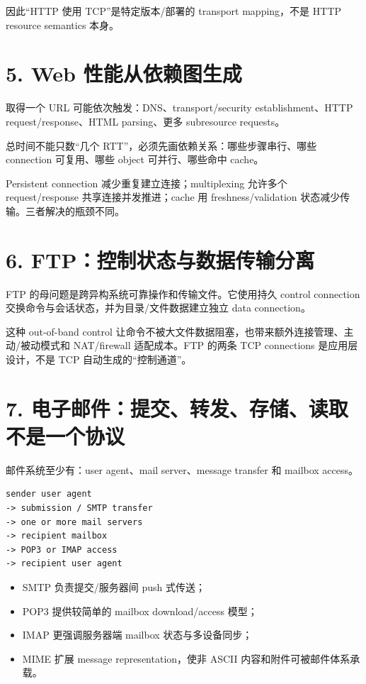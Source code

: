 \documentclass[UTF8,fontset=none,11pt,a4paper]{ctexart}
\providecommand{\tightlist}{\setlength{\itemsep}{0pt}\setlength{\parskip}{0pt}}
\begin{document}
因此``HTTP 使用 TCP''是特定版本/部署的 transport mapping，不是 HTTP
resource semantics 本身。

\section{5. Web
性能从依赖图生成}\label{5-web-ux6027ux80fdux4eceux4f9dux8d56ux56feux751fux6210}

取得一个 URL 可能依次触发：DNS、transport/security establishment、HTTP
request/response、HTML parsing、更多 subresource requests。

总时间不能只数``几个 RTT''，必须先画依赖关系：哪些步骤串行、哪些
connection 可复用、哪些 object 可并行、哪些命中 cache。

Persistent connection 减少重复建立连接；multiplexing 允许多个
request/response 共享连接并发推进；cache 用 freshness/validation
状态减少传输。三者解决的瓶颈不同。

\section{6.
FTP：控制状态与数据传输分离}\label{6-ftpux63a7ux5236ux72b6ux6001ux4e0eux6570ux636eux4f20ux8f93ux5206ux79bb}

FTP 的母问题是跨异构系统可靠操作和传输文件。它使用持久 control
connection 交换命令与会话状态，并为目录/文件数据建立独立 data
connection。

这种 out-of-band control
让命令不被大文件数据阻塞，也带来额外连接管理、主动/被动模式和
NAT/firewall 适配成本。FTP 的两条 TCP connections 是应用层设计，不是 TCP
自动生成的``控制通道''。

\section{7.
电子邮件：提交、转发、存储、读取不是一个协议}\label{7-ux7535ux5b50ux90aeux4ef6ux63d0ux4ea4ux8f6cux53d1ux5b58ux50a8ux8bfbux53d6ux4e0dux662fux4e00ux4e2aux534fux8bae}

邮件系统至少有：user agent、mail server、message transfer 和 mailbox
access。

\begin{lstlisting}
sender user agent
-> submission / SMTP transfer
-> one or more mail servers
-> recipient mailbox
-> POP3 or IMAP access
-> recipient user agent
\end{lstlisting}

\begin{itemize}
\tightlist
\item
  SMTP 负责提交/服务器间 push 式传送；
\item
  POP3 提供较简单的 mailbox download/access 模型；
\item
  IMAP 更强调服务器端 mailbox 状态与多设备同步；
\item
  MIME 扩展 message representation，使非 ASCII
  内容和附件可被邮件体系承载。
\end{itemize}
\end{document}
